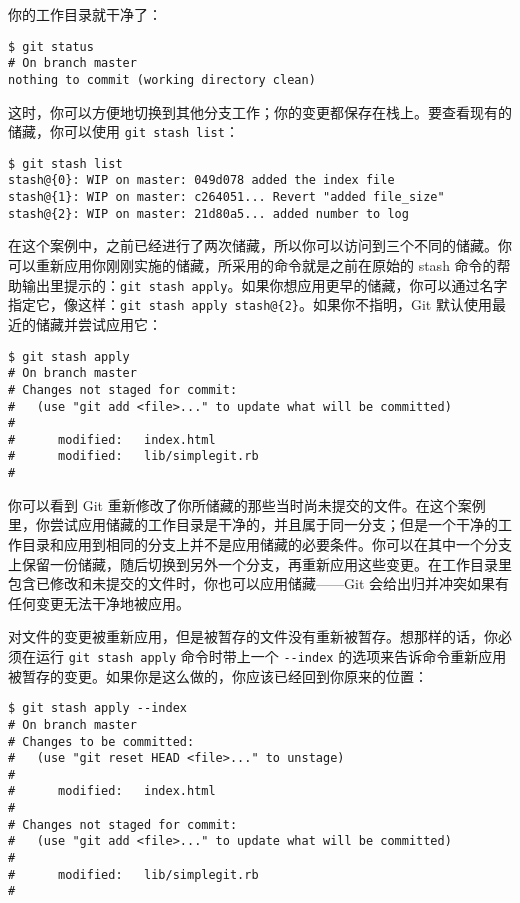 \documentclass[a4paper]{book}
\begin{document}
你的工作目录就干净了：

\begin{shaded}\begin{verbatim}
$ git status
# On branch master
nothing to commit (working directory clean)
\end{verbatim}\end{shaded}

这时，你可以方便地切换到其他分支工作；你的变更都保存在栈上。要查看现有的储藏，你可以使用 \texttt{git stash list}：

\begin{shaded}\begin{verbatim}
$ git stash list
stash@{0}: WIP on master: 049d078 added the index file
stash@{1}: WIP on master: c264051... Revert "added file_size"
stash@{2}: WIP on master: 21d80a5... added number to log
\end{verbatim}\end{shaded}

在这个案例中，之前已经进行了两次储藏，所以你可以访问到三个不同的储藏。你可以重新应用你刚刚实施的储藏，所采用的命令就是之前在原始的 stash 命令的帮助输出里提示的：\texttt{git stash apply}。如果你想应用更早的储藏，你可以通过名字指定它，像这样：\texttt{git stash apply stash@\{2\}}。如果你不指明，Git 默认使用最近的储藏并尝试应用它：

\begin{shaded}\begin{verbatim}
$ git stash apply
# On branch master
# Changes not staged for commit:
#   (use "git add <file>..." to update what will be committed)
#
#      modified:   index.html
#      modified:   lib/simplegit.rb
#
\end{verbatim}\end{shaded}

你可以看到 Git 重新修改了你所储藏的那些当时尚未提交的文件。在这个案例里，你尝试应用储藏的工作目录是干净的，并且属于同一分支；但是一个干净的工作目录和应用到相同的分支上并不是应用储藏的必要条件。你可以在其中一个分支上保留一份储藏，随后切换到另外一个分支，再重新应用这些变更。在工作目录里包含已修改和未提交的文件时，你也可以应用储藏------Git 会给出归并冲突如果有任何变更无法干净地被应用。

对文件的变更被重新应用，但是被暂存的文件没有重新被暂存。想那样的话，你必须在运行 \texttt{git stash apply} 命令时带上一个 \texttt{-{}-index} 的选项来告诉命令重新应用被暂存的变更。如果你是这么做的，你应该已经回到你原来的位置：

\begin{shaded}\begin{verbatim}
$ git stash apply --index
# On branch master
# Changes to be committed:
#   (use "git reset HEAD <file>..." to unstage)
#
#      modified:   index.html
#
# Changes not staged for commit:
#   (use "git add <file>..." to update what will be committed)
#
#      modified:   lib/simplegit.rb
#
\end{verbatim}\end{shaded}
\end{document}
